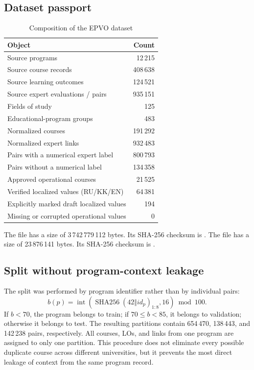 \documentclass[twoside,11pt]{article}
\begin{document}
\subsection{Dataset passport}

\begin{table}[H]
\centering
\caption{Composition of the EPVO dataset}
\label{tab:dataset}
\begin{tabularx}{\linewidth}{>{\raggedright\arraybackslash}X r}
\toprule
\textbf{Object} & \textbf{Count}\\
\midrule
Source programs & 12\,215\\
Source course records & 408\,638\\
Source learning outcomes & 124\,521\\
Source expert evaluations / pairs & 935\,151\\
Fields of study & 125\\
Educational-program groups & 483\\
Normalized courses & 191\,292\\
Normalized expert links & 932\,483\\
Pairs with a numerical expert label & 800\,793\\
Pairs without a numerical label & 134\,358\\
Approved operational courses & 21\,525\\
Verified localized values (RU/KK/EN) & 64\,381\\
Explicitly marked draft localized values & 194\\
Missing or corrupted operational values & 0\\
\bottomrule
\end{tabularx}
\end{table}

The file  has a size of 3\,742\,779\,112 bytes. Its SHA-256 checksum is
.
The file  has a size of 23\,876\,141 bytes. Its SHA-256 checksum is
.

\subsection{Split without program-context leakage}

The split was performed by program identifier rather than by individual pairs:
\begin{equation}
  b(p)=
  \operatorname{int}\left(
  \operatorname{SHA256}(42\Vert id_p)_{1:8},16
  \right)\bmod 100.
  \label{eq:split}
\end{equation}
If $b<70$, the program belongs to train; if $70\le b<85$, it belongs to validation; otherwise it belongs to test. The resulting partitions contain 654\,470, 138\,443, and 142\,238 pairs, respectively. All courses, LOs, and links from one program are assigned to only one partition. This procedure does not eliminate every possible duplicate course across different universities, but it prevents the most direct leakage of context from the same program record.
\end{document}
